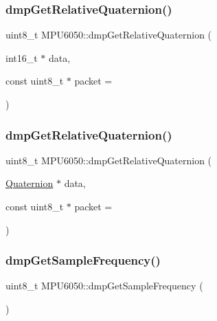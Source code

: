 \mbox{\label{classMPU6050_ac74ebf94e4504dfe258d8c739d63d807}} 
\subsubsection{\texorpdfstring{dmpGetRelativeQuaternion()}{dmpGetRelativeQuaternion()}\hspace{0.1cm}{\footnotesize\ttfamily [2/3]}}
{\footnotesize\ttfamily uint8\+\_\+t M\+P\+U6050\+::dmp\+Get\+Relative\+Quaternion (\begin{DoxyParamCaption}\item[{int16\+\_\+t $\ast$}]{data,  }\item[{const uint8\+\_\+t $\ast$}]{packet = {} }\end{DoxyParamCaption})}

\mbox{\label{classMPU6050_ad1b10602a76de6a84365ff2c3e3ee69d}} 
\subsubsection{\texorpdfstring{dmpGetRelativeQuaternion()}{dmpGetRelativeQuaternion()}\hspace{0.1cm}{\footnotesize\ttfamily [3/3]}}
{\footnotesize\ttfamily uint8\+\_\+t M\+P\+U6050\+::dmp\+Get\+Relative\+Quaternion (\begin{DoxyParamCaption}\item[{\mbox{\hyperlink{classQuaternion}{Quaternion}} $\ast$}]{data,  }\item[{const uint8\+\_\+t $\ast$}]{packet = {} }\end{DoxyParamCaption})}

\mbox{\label{classMPU6050_a88b471672ecfe54e46868ab985d8d82b}} 
\subsubsection{\texorpdfstring{dmpGetSampleFrequency()}{dmpGetSampleFrequency()}}
{\footnotesize\ttfamily uint8\+\_\+t M\+P\+U6050\+::dmp\+Get\+Sample\+Frequency (\begin{DoxyParamCaption}{ }\end{DoxyParamCaption})}

